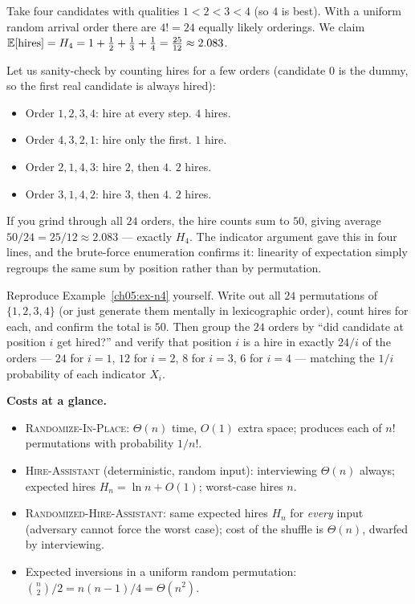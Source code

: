 \begin{example}[Hiring with $n = 4$, fully enumerated]
\label{ch05:ex-n4}
Take four candidates with qualities $1 < 2 < 3 < 4$ (so $4$ is best). With a
uniform random arrival order there are $4! = 24$ equally likely orderings. We
claim $\mathbb{E}[\text{hires}] = H_4 = 1 + \tfrac12 + \tfrac13 + \tfrac14 =
\tfrac{25}{12} \approx 2.083$.

Let us sanity-check by counting hires for a few orders (candidate $0$ is the
dummy, so the first real candidate is always hired):
\begin{itemize}
  \item Order $1,2,3,4$: hire at every step. $4$ hires.
  \item Order $4,3,2,1$: hire only the first. $1$ hire.
  \item Order $2,1,4,3$: hire $2$, then $4$. $2$ hires.
  \item Order $3,1,4,2$: hire $3$, then $4$. $2$ hires.
\end{itemize}
If you grind through all $24$ orders, the hire counts sum to $50$, giving average
$50/24 = 25/12 \approx 2.083$ --- exactly $H_4$. The indicator argument gave this
in four lines, and the brute-force enumeration confirms it: linearity of
expectation simply regroups the same sum by position rather than by permutation.
\end{example}

\begin{labbox}
Reproduce Example~\ref{ch05:ex-n4} yourself. Write out all $24$ permutations of
$\{1,2,3,4\}$ (or just generate them mentally in lexicographic order), count
hires for each, and confirm the total is $50$. Then group the $24$ orders by
``did candidate at position $i$ get hired?'' and verify that position $i$ is a
hire in exactly $24/i$ of the orders --- $24$ for $i=1$, $12$ for $i=2$, $8$ for
$i=3$, $6$ for $i=4$ --- matching the $1/i$ probability of each indicator $X_i$.
\end{labbox}

\begin{complexitybox}
\textbf{Costs at a glance.}
\begin{itemize}
  \item \textsc{Randomize-In-Place}: $\Theta(n)$ time, $O(1)$ extra space;
        produces each of $n!$ permutations with probability $1/n!$.
  \item \textsc{Hire-Assistant} (deterministic, random input): interviewing
        $\Theta(n)$ always; expected hires $H_n = \ln n + O(1)$; worst-case hires
        $n$.
  \item \textsc{Randomized-Hire-Assistant}: same expected hires $H_n$ for
        \emph{every} input (adversary cannot force the worst case); cost of the
        shuffle is $\Theta(n)$, dwarfed by interviewing.
  \item Expected inversions in a uniform random permutation:
        $\binom{n}{2}/2 = n(n-1)/4 = \Theta(n^2)$.
\end{itemize}
\end{complexitybox}

